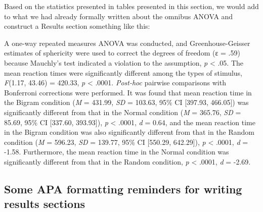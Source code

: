 \documentclass[
]{book}
\begin{document}
Based on the statistics presented in tables presented in this section, we would add to what we had already formally written about the omnibus ANOVA and construct a Results section something like this:

A one-way repeated measures ANOVA was conducted, and Greenhouse-Geisser estimates of sphericity were used to correct the degrees of freedom (ε = .59) because Mauchly's test indicated a violation to the assumption, \emph{p} \textless{} .05. The mean reaction times were significantly different among the types of stimulus, \emph{F}(1.17, 43.46) = 420.33, \emph{p} \textless{} .0001. \emph{Post-hoc} pairwise comparisons with Bonferroni corrections were performed. It was found that mean reaction time in the Bigram condition (\emph{M} = 431.99, \emph{SD} = 103.63, 95\% CI {[}397.93, 466.05{]}) was significantly different from that in the Normal condition (\emph{M} = 365.76, \emph{SD} = 85.69, 95\% CI {[}337.60, 393.93{]}), \emph{p} \textless{} .0001, \emph{d} = 0.64, and the mean reaction time in the Bigram condition was also significantly different from that in the Random condition (\emph{M} = 596.23, \emph{SD} = 139.77, 95\% CI {[}550.29, 642.29{]}), \emph{p} \textless{} .0001, \emph{d} = -1.58. Furthermore, the mean reaction time in the Normal condition was significantly different from that in the Random condition, \emph{p} \textless{} .0001, \emph{d} = -2.69.

\hypertarget{some-apa-formatting-reminders-for-writing-results-sections-2}{%
\subsection{Some APA formatting reminders for writing results sections}\label{some-apa-formatting-reminders-for-writing-results-sections-2}}
\end{document}

